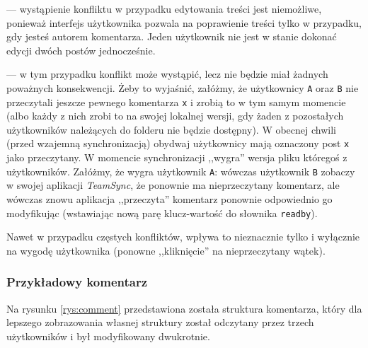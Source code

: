 \documentclass[polish,a4paper,twoside]{ppfcmthesis}
\begin{document}
\begin{description}[noitemsep]
  \item[Modyfikacja treści] --- wystąpienie konfliktu w przypadku edytowania treści jest niemożliwe, ponieważ interfejs użytkownika pozwala na poprawienie treści tylko w przypadku, gdy jesteś autorem komentarza. Jeden użytkownik nie jest w stanie dokonać edycji dwóch postów jednocześnie.
  
  \item[Odznaczenie jako przeczytane] --- w tym przypadku konflikt może wystąpić, lecz nie będzie miał żadnych poważnych konsekwencji. Żeby to wyjaśnić, załóżmy, że użytkownicy \texttt{A} oraz \texttt{B} nie przeczytali jeszcze pewnego komentarza \texttt{x} i zrobią to w tym samym momencie (albo każdy z nich zrobi to na swojej lokalnej wersji, gdy żaden z pozostałych użytkowników należących do folderu nie będzie dostępny). W obecnej chwili (przed wzajemną synchronizacją) obydwaj użytkownicy mają oznaczony post \texttt{x} jako przeczytany. W momencie synchronizacji ,,wygra'' wersja pliku któregoś z użytkowników. Załóżmy, że wygra użytkownik \texttt{A}: wówczas użytkownik \texttt{B} zobaczy w swojej aplikacji \emph{TeamSync}, że ponownie ma nieprzeczytany komentarz, ale wówczas znowu aplikacja ,,przeczyta'' komentarz ponownie odpowiednio go modyfikując (wstawiając nową parę klucz-wartość do słownika \texttt{readby}).
  
  Nawet w przypadku częstych konfliktów, wpływa to nieznacznie tylko i wyłącznie na wygodę użytkownika (ponowne ,,kliknięcie'' na nieprzeczytany wątek).
\end{description}

\subsubsection*{Przykładowy komentarz}

Na rysunku \ref{rys:comment} przedstawiona została struktura komentarza, który dla lepszego zobrazowania własnej struktury został odczytany przez trzech użytkowników i był modyfikowany dwukrotnie.
\end{document}
